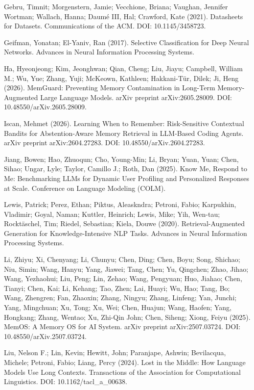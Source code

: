 Gebru, Timnit; Morgenstern, Jamie; Vecchione, Briana; Vaughan, Jennifer
Wortman; Wallach, Hanna; Daumé III, Hal; Crawford, Kate (2021).
Datasheets for Datasets. Communications of the ACM. DOI:
10.1145/3458723.

Geifman, Yonatan; El-Yaniv, Ran (2017). Selective Classification for
Deep Neural Networks. Advances in Neural Information Processing Systems.

Ha, Hyeonjeong; Kim, Jeonghwan; Qian, Cheng; Liu, Jiayu; Campbell,
William M.; Wu, Yue; Zhang, Yuji; McKeown, Kathleen; Hakkani-Tür, Dilek;
Ji, Heng (2026). MemGuard: Preventing Memory Contamination in Long-Term
Memory-Augmented Large Language Models. arXiv preprint arXiv:2605.28009.
DOI: 10.48550/arXiv.2605.28009.

Iscan, Mehmet (2026). Learning When to Remember: Risk-Sensitive
Contextual Bandits for Abstention-Aware Memory Retrieval in LLM-Based
Coding Agents. arXiv preprint arXiv:2604.27283. DOI:
10.48550/arXiv.2604.27283.

Jiang, Bowen; Hao, Zhuoqun; Cho, Young-Min; Li, Bryan; Yuan, Yuan; Chen,
Sihao; Ungar, Lyle; Taylor, Camillo J.; Roth, Dan (2025). Know Me,
Respond to Me: Benchmarking LLMs for Dynamic User Profiling and
Personalized Responses at Scale. Conference on Language Modeling (COLM).

Lewis, Patrick; Perez, Ethan; Piktus, Aleaskndra; Petroni, Fabio;
Karpukhin, Vladimir; Goyal, Naman; Kuttler, Heinrich; Lewis, Mike; Yih,
Wen-tau; Rocktäschel, Tim; Riedel, Sebastian; Kiela, Douwe (2020).
Retrieval-Augmented Generation for Knowledge-Intensive NLP Tasks.
Advances in Neural Information Processing Systems.

Li, Zhiyu; Xi, Chenyang; Li, Chunyu; Chen, Ding; Chen, Boyu; Song,
Shichao; Niu, Simin; Wang, Hanyu; Yang, Jiawei; Tang, Chen; Yu,
Qingchen; Zhao, Jihao; Wang, Yezhaohui; Liu, Peng; Lin, Zehao; Wang,
Pengyuan; Huo, Jiahao; Chen, Tianyi; Chen, Kai; Li, Kehang; Tao, Zhen;
Lai, Huayi; Wu, Hao; Tang, Bo; Wang, Zhengren; Fan, Zhaoxin; Zhang,
Ningyu; Zhang, Linfeng; Yan, Junchi; Yang, Mingchuan; Xu, Tong; Xu, Wei;
Chen, Huajun; Wang, Haofen; Yang, Hongkang; Zhang, Wentao; Xu, Zhi-Qin
John; Chen, Siheng; Xiong, Feiyu (2025). MemOS: A Memory OS for AI
System. arXiv preprint arXiv:2507.03724. DOI: 10.48550/arXiv.2507.03724.

Liu, Nelson F.; Lin, Kevin; Hewitt, John; Paranjape, Ashwin; Bevilacqua,
Michele; Petroni, Fabio; Liang, Percy (2024). Lost in the Middle: How
Language Models Use Long Contexts. Transactions of the Association for
Computational Linguistics. DOI: 10.1162/tacl\_a\_00638.

